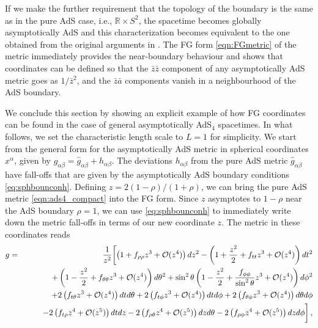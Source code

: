 \documentclass[a4paper,11pt]{article}
\numberwithin{equation}{section}
\begin{document}
If we make the further requirement that the topology of the boundary is the same as in the pure AdS case, i.e., $\mathbb{R}\times S^2$, the spacetime becomes globally asymptotically AdS and this characterization becomes equivalent to the one obtained from the original arguments in \cite{Henneaux:1985tv}. 
The FG form \eqref{eqn:FGmetric} of the metric immediately provides the near-boundary behaviour and shows that coordinates can be defined so that the $\bar{z}\bar{z}$ component of any asymptotically AdS metric goes as $1/\bar{z}^2$, and the $\bar{z}\bar{a}$ components vanish in a neighbourhood of the AdS boundary.

We conclude this section by showing an explicit example of how FG coordinates can be found in the case of general asymptotically AdS$_4$ spacetimes. 
In what follows, we set the characteristic length scale to $L=1$ for simplicity.
We start from the general form for the asymptotically AdS metric in spherical coordinates $x^\alpha$, given by $g_{\alpha\beta}=\hat{g}_{\alpha\beta}+h_{\alpha\beta}$.
The deviations $h_{\alpha\beta}$ from the pure AdS metric $\hat{g}_{\alpha\beta}$ have fall-offs that are given by the asymptotically AdS boundary conditions \eqref{eq:sphbounconh}.
Defining $z=2(1-\rho)/(1+\rho)$, we can bring the pure AdS metric \eqref{eqn:ads4_compact} into the FG form.
Since $z$ asymptotes to $1-\rho$ near the AdS boundary $\rho=1$, we can use \eqref{eq:sphbounconh} to immediately write down the metric fall-offs in terms of our new coordinate $z$.
The metric in these coordinates reads
\begin{eqnarray}
\label{eq:metnewcoords}
g&=&\frac{1}{z^2}\biggl[ 
\left(1+f_{\rho\rho}z^3+\mathcal{O}(z^4)\right)dz^2 - \left(1+\frac{z^2}{2}+f_{tt}z^3+\mathcal{O}(z^4)\right)dt^2 \\
&&\hspace{0.75cm} + \left(1-\frac{z^2}{2}+f_{\theta\theta}z^3 +\mathcal{O}(z^4) \right)d\theta^2 + \sin^2\theta \left(1-\frac{z^2}{2}+\frac{f_{\phi\phi}}{\sin^2\theta} z^3 +\mathcal{O}(z^4) \right)d\phi^2\nonumber\\ 
&&\hspace{0.75cm}+ 2 \left( f_{t\theta}z^3 +\mathcal{O}(z^4)\right)dt d\theta + 2 \left( f_{t\phi} z^3+\mathcal{O}(z^4)\right)dt d\phi+ 2 \left(f_{\theta\phi} z^3 +\mathcal{O}(z^4)\right)d\theta d\phi 
 \nonumber\\
&&\hspace{0.75cm}-2\left(f_{t\rho}z^4 +\mathcal{O}(z^5)\right)dtdz-2\left(f_{\rho\theta}z^4+\mathcal{O}(z^5)\right)dzd\theta
-2\left(f_{\rho\phi}z^4 +\mathcal{O}(z^5)\right)dzd\phi\biggr]\,,\nonumber
\end{eqnarray}
\end{document}
